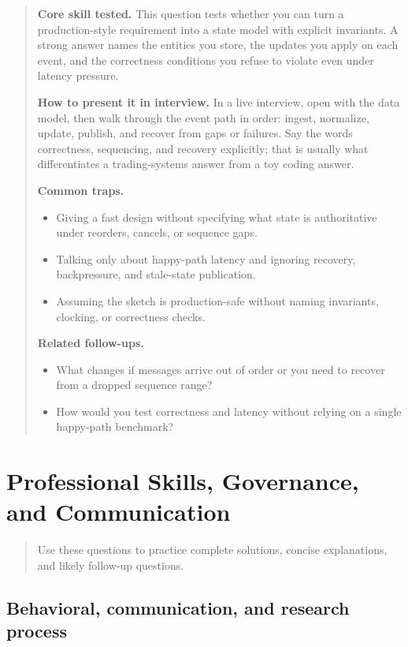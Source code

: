 \documentclass[11pt,letterpaper,openany]{book}
\newcommand{\ChapterIntro}[1]{%
  \begin{quote}\small #1\end{quote}%
}
\newenvironment{EditorialNote}
  {\begin{quote}\small\setlength{\parskip}{0.25em}}
  {\end{quote}}
\newcommand{\QuestionSpacer}{\vspace{0.4em}}
\begin{document}
\begin{EditorialNote}


\textbf{Core skill tested.} This question tests whether you can turn a production-style requirement into a state model with explicit invariants. A strong answer names the entities you store, the updates you apply on each event, and the correctness conditions you refuse to violate even under latency pressure.

\textbf{How to present it in interview.} In a live interview, open with the data model, then walk through the event path in order: ingest, normalize, update, publish, and recover from gaps or failures. Say the words correctness, sequencing, and recovery explicitly; that is usually what differentiates a trading-systems answer from a toy coding answer.

\textbf{Common traps.}
\begin{itemize}
\item Giving a fast design without specifying what state is authoritative under reorders, cancels, or sequence gaps.
\item Talking only about happy-path latency and ignoring recovery, backpressure, and stale-state publication.
\item Assuming the sketch is production-safe without naming invariants, clocking, or correctness checks.
\end{itemize}

\textbf{Related follow-ups.}
\begin{itemize}
\item What changes if messages arrive out of order or you need to recover from a dropped sequence range?
\item How would you test correctness and latency without relying on a single happy-path benchmark?
\end{itemize}


\end{EditorialNote}
\QuestionSpacer

\section{Professional Skills, Governance, and Communication}
\ChapterIntro{Use these questions to practice complete solutions, concise explanations, and likely follow-up questions.}

\subsection{Behavioral, communication, and research process}
\end{document}
